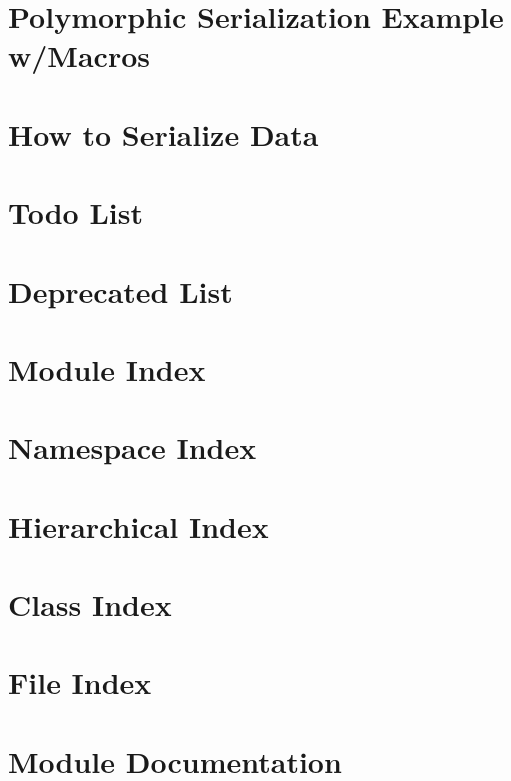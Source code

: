 \documentclass[twoside]{book}
\newcommand{\+}{\discretionary{\mbox{\scriptsize$\hookleftarrow$}}{}{}}
\begin{document}
\chapter{Polymorphic Serialization Example w/\+Macros}
\label{ckpt_learn_example_polymorphic_macro}

\chapter{How to Serialize Data}
\label{ckpt_learn_serialize}

\chapter{Todo List}
\label{todo}

\chapter{Deprecated List}
\label{deprecated}

\chapter{Module Index}

\chapter{Namespace Index}

\chapter{Hierarchical Index}

\chapter{Class Index}

\chapter{File Index}

\chapter{Module Documentation}





\end{document}
